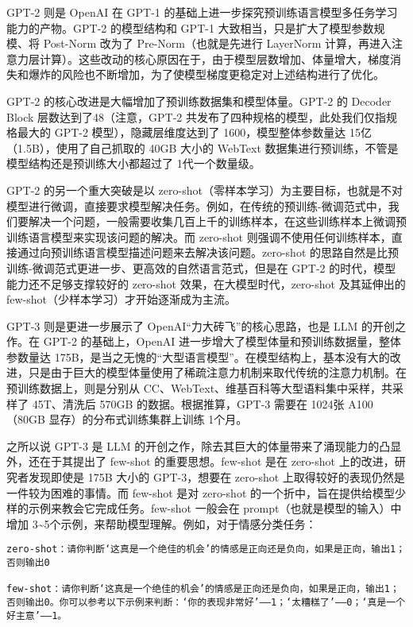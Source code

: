\documentclass[
]{article}
\begin{document}
GPT-2 则是 OpenAI 在 GPT-1
的基础上进一步探究预训练语言模型多任务学习能力的产物。GPT-2 的模型结构和
GPT-1 大致相当，只是扩大了模型参数规模、将 Post-Norm 改为了
Pre-Norm（也就是先进行 LayerNorm
计算，再进入注意力层计算）。这些改动的核心原因在于，由于模型层数增加、体量增大，梯度消失和爆炸的风险也不断增加，为了使模型梯度更稳定对上述结构进行了优化。

GPT-2 的核心改进是大幅增加了预训练数据集和模型体量。GPT-2 的 Decoder
Block 层数达到了48（注意，GPT-2
共发布了四种规格的模型，此处我们仅指规格最大的 GPT-2
模型），隐藏层维度达到了 1600，模型整体参数量达
15亿（1.5B），使用了自己抓取的 40GB 大小的 WebText
数据集进行预训练，不管是模型结构还是预训练大小都超过了 1代一个数量级。

GPT-2 的另一个重大突破是以
zero-shot（零样本学习）为主要目标，也就是不对模型进行微调，直接要求模型解决任务。例如，在传统的预训练-微调范式中，我们要解决一个问题，一般需要收集几百上千的训练样本，在这些训练样本上微调预训练语言模型来实现该问题的解决。而
zero-shot
则强调不使用任何训练样本，直接通过向预训练语言模型描述问题来去解决该问题。zero-shot
的思路自然是比预训练-微调范式更进一步、更高效的自然语言范式，但是在
GPT-2 的时代，模型能力还不足够支撑较好的 zero-shot
效果，在大模型时代，zero-shot 及其延伸出的
few-shot（少样本学习）才开始逐渐成为主流。

GPT-3 则是更进一步展示了 OpenAI``力大砖飞''的核心思路，也是 LLM
的开创之作。在 GPT-2 的基础上，OpenAI
进一步增大了模型体量和预训练数据量，整体参数量达
175B，是当之无愧的``大型语言模型''。在模型结构上，基本没有大的改进，只是由于巨大的模型体量使用了稀疏注意力机制来取代传统的注意力机制。在预训练数据上，则是分别从
CC、WebText、维基百科等大型语料集中采样，共采样了 45T、清洗后 570GB
的数据。根据推算，GPT-3 需要在 1024张 A100（80GB
显存）的分布式训练集群上训练 1个月。

之所以说 GPT-3 是 LLM
的开创之作，除去其巨大的体量带来了涌现能力的凸显外，还在于其提出了
few-shot 的重要思想。few-shot 是在 zero-shot 上的改进，研究者发现即使是
175B 大小的 GPT-3，想要在 zero-shot
上取得较好的表现仍然是一件较为困难的事情。而 few-shot 是对 zero-shot
的一个折中，旨在提供给模型少样的示例来教会它完成任务。few-shot 一般会在
prompt（也就是模型的输入）中增加
3\textasciitilde5个示例，来帮助模型理解。例如，对于情感分类任务：

\begin{verbatim}
zero-shot：请你判断‘这真是一个绝佳的机会’的情感是正向还是负向，如果是正向，输出1；否则输出0

few-shot：请你判断‘这真是一个绝佳的机会’的情感是正向还是负向，如果是正向，输出1；否则输出0。你可以参考以下示例来判断：‘你的表现非常好’——1；‘太糟糕了’——0；‘真是一个好主意’——1。
\end{verbatim}
\end{document}
